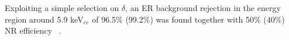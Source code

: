 \documentclass[physics,article,submit,moreauthors,pdftex]{Definitions/mdpi}
\newcommand{\fe}{\ensuremath{^{55}\textrm{Fe}}\xspace}
\newcommand{\ambe}{\ensuremath{\textrm{Am} \textrm{Be}}\xspace}
\newcommand{\lemon}{{\textsc{Lemon}}\xspace}
\newcommand{\unit}[1]{\ensuremath{\textrm{\,#1}}\xspace}
\newcommand{\keV}{\ensuremath{\,\textrm{keV}}\xspace}
\begin{document}
Exploiting a simple selection on $\delta$,  an ER background rejection in the energy region around 5.9 keV$_{ee}$ of 96.5$\%$ (99.2$\%$) was found together with  50$\%$ (40$\%$) NR efficiency ~\cite{bib:coronello}.








\end{document}
